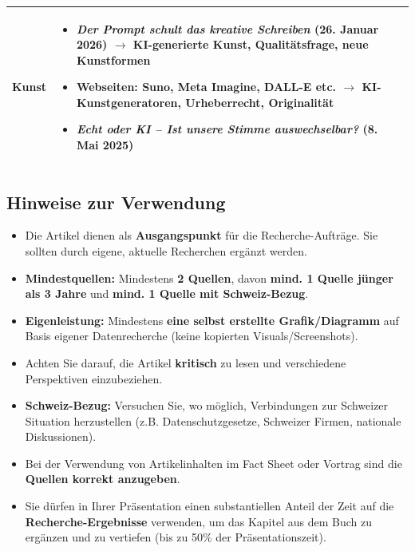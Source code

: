 \begin{longtable}{@{}lp{14cm}@{}}
	\textbf{Kunst} &
	\begin{itemize}[leftmargin=*,noitemsep,topsep=0pt]
		\item[\faFilePdf{}] \textit{Der Prompt schult das kreative Schreiben} (26. Januar 2026) \newline
		$\rightarrow$ KI-generierte Kunst, Qualitätsfrage, neue Kunstformen
		\item[\faSafari] Webseiten: Suno, Meta Imagine, DALL-E etc. \newline
		$\rightarrow$ KI-Kunstgeneratoren, Urheberrecht, Originalität
		\item[\faPlayCircle{}] \textit{Echt oder KI -- Ist unsere Stimme auswechselbar?} (8. Mai 2025) \href{https://www.srf.ch/play/tv/einstein/video/echt-oder-ki-ist-unsere-stimme-auswechselbar?urn=urn:srf:video:e7fc0175-a736-4e9e-8e98-f27f231175c4}{\faLink}
	\end{itemize} \\

	\bottomrule
\end{longtable}

\normalsize
\newpage
\subsection*{Hinweise zur Verwendung}

\begin{itemize}
	\item Die Artikel dienen als \textbf{Ausgangspunkt} für die Recherche-Aufträge. Sie sollten durch eigene, aktuelle Recherchen ergänzt werden.
	\item \textbf{Mindestquellen:} Mindestens \textbf{2 Quellen}, davon \textbf{mind. 1 Quelle jünger als 3 Jahre} und \textbf{mind. 1 Quelle mit Schweiz-Bezug}.
	\item \textbf{Eigenleistung:} Mindestens \textbf{eine selbst erstellte Grafik/Diagramm} auf Basis eigener Datenrecherche (keine kopierten Visuals/Screenshots).
	\item Achten Sie darauf, die Artikel \textbf{kritisch} zu lesen und verschiedene Perspektiven einzubeziehen.
	\item \textbf{Schweiz-Bezug:} Versuchen Sie, wo möglich, Verbindungen zur Schweizer Situation herzustellen (z.B. Datenschutzgesetze, Schweizer Firmen, nationale Diskussionen).
	\item Bei der Verwendung von Artikelinhalten im Fact Sheet oder Vortrag sind die \textbf{Quellen korrekt anzugeben}.
	\item Sie dürfen in Ihrer Präsentation einen substantiellen Anteil der Zeit auf die \textbf{Recherche-Ergebnisse} verwenden, um das Kapitel aus dem Buch zu ergänzen und zu vertiefen (bis zu 50\% der Präsentationszeit).
\end{itemize}


